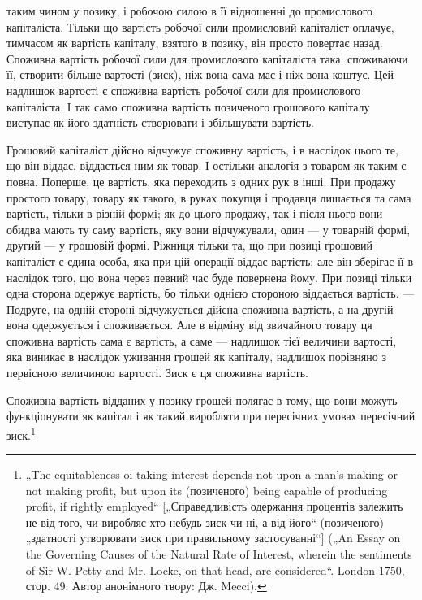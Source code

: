 \parcont{}  %
таким чином у позику, і робочою силою в її відношенні до промислового
капіталіста. Тільки що вартість робочої сили промисловий
капіталіст оплачує, тимчасом як вартість капіталу, взятого
в позику, він просто повертає назад. Споживна вартість робочої
сили для промислового капіталіста така: споживаючи її, створити
більше вартості (зиск), ніж вона сама має і ніж вона коштує.
Цей надлишок вартості є споживна вартість робочої сили для
промислового капіталіста. І так само споживна вартість позиченого
грошового капіталу виступає як його здатність створювати
і збільшувати вартість.

Грошовий капіталіст дійсно відчужує споживну вартість, і в наслідок
цього те, що він віддає, віддається ним як товар. І остільки
аналогія з товаром як таким є повна. Поперше, це вартість, яка
переходить з одних рук в інші. При продажу простого товару,
товару як такого, в руках покупця і продавця лишається та сама
вартість, тільки в різній формі; як до цього продажу, так і після
нього вони обидва мають ту саму вартість, яку вони відчужували,
один — у товарній формі, другий — у грошовій формі. Ріжниця
тільки та, що при позиці грошовий капіталіст є єдина особа, яка
при цій операції віддає вартість; але він зберігає її в наслідок того,
що вона через певний час буде повернена йому. При позиці тільки
одна сторона одержує вартість, бо тільки однією стороною віддається
вартість. — Подруге, на одній стороні відчужується дійсна
споживна вартість, а на другій вона одержується і споживається.
Але в відміну від звичайного товару ця споживна вартість сама є
вартість, а саме — надлишок тієї величини вартості, яка виникає
в наслідок уживання грошей як капіталу, надлишок порівняно з
первісною величиною вартості. Зиск є ця споживна вартість.

Споживна вартість відданих у позику грошей полягає в тому,
що вони можуть функціонувати як капітал і як такий виробляти
при пересічних умовах пересічний зиск.\footnote{
„The equitableness oi taking interest depends not upon a man’s making or
not making profit, but upon its (позиченого) being capable of producing profit, if
rightly employed“ [„Справедливість одержання процентів залежить не від того, чи
виробляє хто-небудь зиск чи ні, а від його“ (позиченого) „здатності утворювати
зиск при правильному застосуванні“] („An Essay on the Governing Causes of
the Natural Rate of Interest, wherein the sentiments of Sir W. Petty and
Mr. Locke, on that head, are considered“. London 1750, стор. 49. Автор анонімного
твору: Дж. Mecci).
}

